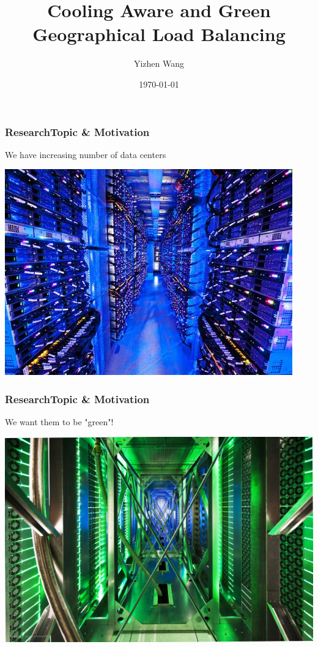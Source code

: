 \documentclass{beamer}
\title[Green GLB]{Cooling Aware and Green Geographical Load Balancing}
\author{Yizhen Wang}
\institute[Caltech]
{
California Institute of Technology \\
\medskip
{\emph{ywang3@caltech.edu}}
}
\date{\today}
\begin{document}
%
\begin{frame}
\titlepage
\end{frame}
%
%
\begin{frame}
\frametitle{ResearchTopic \& Motivation}
\begin{block}
{We have increasing number of data centers}

\includegraphics[scale = 0.7]{datacenter.jpg}

\end{block}
\end{frame}
%
%
\begin{frame}
\frametitle{ResearchTopic \& Motivation}
\begin{block}
{We want them to be "green"!}

\includegraphics[scale = 0.15]{green.jpg}

\end{block}
\end{frame}
\end{document}
